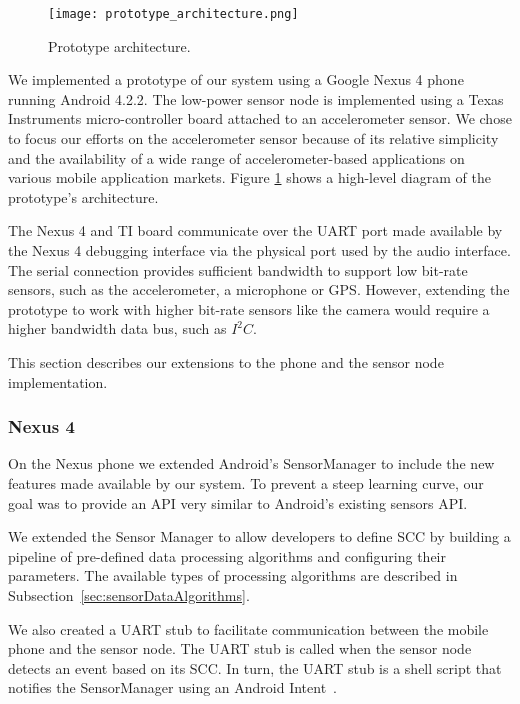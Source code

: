 \begin{figure}[t]
	\centering
	\texttt{[image: prototype\_architecture.png]}
	\caption{Prototype architecture.}
    \label{fig:prototypeArchitecture}
\end{figure}

We implemented a prototype of our system using a Google Nexus 4 phone
running Android 4.2.2.  The low-power sensor node is implemented using
a Texas Instruments micro-controller board attached to an
accelerometer sensor.  We chose to focus our efforts on the
accelerometer sensor because of its relative simplicity and the
availability of a wide range of accelerometer-based applications on
various mobile application markets.  Figure
\ref{fig:prototypeArchitecture} shows a high-level diagram of the
prototype's architecture.

The Nexus 4 and TI board communicate over the UART port made available
by the Nexus 4 debugging interface via the physical port used by the
audio interface.  The serial connection provides sufficient bandwidth
to support low bit-rate sensors, such as the accelerometer, a
microphone or GPS.  However, extending the prototype to work with
higher bit-rate sensors like the camera would require a higher
bandwidth data bus, such as $I^2C$.

This section describes our extensions to the phone and the
sensor node implementation.

\subsubsection{Nexus 4}
\label{subsec:nexus}

On the Nexus phone we extended Android's SensorManager to include the
new features made available by our system. To prevent a steep learning
curve, our goal was to provide an API very similar to Android's
existing sensors API.  

We extended the Sensor Manager to allow developers to define SCC by building
a pipeline of pre-defined data processing algorithms and configuring their
parameters. The available types of processing algorithms are
described in Subsection~\ref{sec:sensorDataAlgorithms}.

We also created a UART stub to facilitate communication between the
mobile phone and the sensor node. The UART stub is called when
the sensor node detects an event based on its SCC.
In turn, the UART stub is a shell script that notifies the
SensorManager using an Android Intent~\cite{androidintents}.

